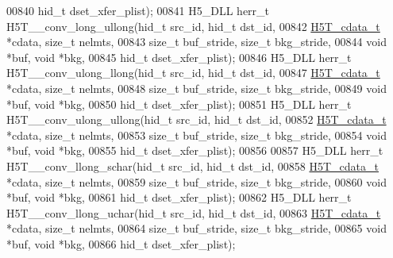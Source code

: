 \begin{DoxyCode}
00840                                    hid\_t dset\_xfer\_plist);
00841 H5\_DLL herr\_t H5T\_\_conv\_long\_ullong(hid\_t src\_id, hid\_t dst\_id,
00842                     \hyperlink{struct_h5_t__cdata__t}{H5T\_cdata\_t} *cdata, \textcolor{keywordtype}{size\_t} nelmts,
00843                     \textcolor{keywordtype}{size\_t} buf\_stride, \textcolor{keywordtype}{size\_t} bkg\_stride,
00844                                     \textcolor{keywordtype}{void} *buf, \textcolor{keywordtype}{void} *bkg,
00845                                     hid\_t dset\_xfer\_plist);
00846 H5\_DLL herr\_t H5T\_\_conv\_ulong\_llong(hid\_t src\_id, hid\_t dst\_id,
00847                     \hyperlink{struct_h5_t__cdata__t}{H5T\_cdata\_t} *cdata, \textcolor{keywordtype}{size\_t} nelmts,
00848                     \textcolor{keywordtype}{size\_t} buf\_stride, \textcolor{keywordtype}{size\_t} bkg\_stride,
00849                                     \textcolor{keywordtype}{void} *buf, \textcolor{keywordtype}{void} *bkg,
00850                                     hid\_t dset\_xfer\_plist);
00851 H5\_DLL herr\_t H5T\_\_conv\_ulong\_ullong(hid\_t src\_id, hid\_t dst\_id,
00852                      \hyperlink{struct_h5_t__cdata__t}{H5T\_cdata\_t} *cdata, \textcolor{keywordtype}{size\_t} nelmts,
00853                      \textcolor{keywordtype}{size\_t} buf\_stride, \textcolor{keywordtype}{size\_t} bkg\_stride,
00854                                      \textcolor{keywordtype}{void} *buf, \textcolor{keywordtype}{void} *bkg,
00855                                      hid\_t dset\_xfer\_plist);
00856 
00857 H5\_DLL herr\_t H5T\_\_conv\_llong\_schar(hid\_t src\_id, hid\_t dst\_id,
00858                     \hyperlink{struct_h5_t__cdata__t}{H5T\_cdata\_t} *cdata, \textcolor{keywordtype}{size\_t} nelmts,
00859                     \textcolor{keywordtype}{size\_t} buf\_stride, \textcolor{keywordtype}{size\_t} bkg\_stride,
00860                                     \textcolor{keywordtype}{void} *buf, \textcolor{keywordtype}{void} *bkg,
00861                                     hid\_t dset\_xfer\_plist);
00862 H5\_DLL herr\_t H5T\_\_conv\_llong\_uchar(hid\_t src\_id, hid\_t dst\_id,
00863                     \hyperlink{struct_h5_t__cdata__t}{H5T\_cdata\_t} *cdata, \textcolor{keywordtype}{size\_t} nelmts,
00864                     \textcolor{keywordtype}{size\_t} buf\_stride, \textcolor{keywordtype}{size\_t} bkg\_stride,
00865                                     \textcolor{keywordtype}{void} *buf, \textcolor{keywordtype}{void} *bkg,
00866                                     hid\_t dset\_xfer\_plist);

\end{DoxyCode}
